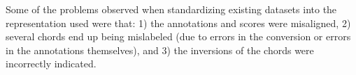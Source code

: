 
Some of the problems observed when standardizing existing
datasets into the representation used were that: 1) the
annotations and scores were misaligned, 2) several chords
end up being mislabeled (due to errors in the conversion or
errors in the annotations themselves), and 3) the inversions
of the chords were incorrectly indicated.
